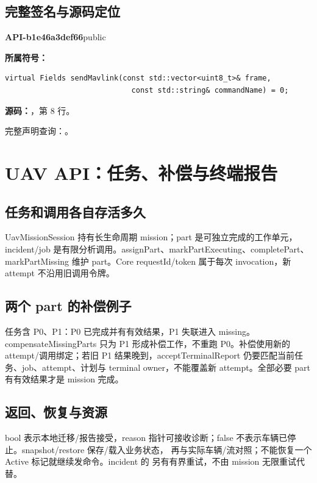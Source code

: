 \subsection{完整签名与源码定位}

\textbf{API-b1e46a3def66}\quad public\par
\textbf{所属符号：}\par
\begin{Verbatim}[fontsize=\footnotesize,breaklines,breakanywhere]
virtual Fields sendMavlink(const std::vector<uint8_t>& frame,
                             const std::string& commandName) = 0;
\end{Verbatim}
\textbf{源码：}，第 8 行。\par

完整声明查询：。

\section{UAV API：任务、补偿与终端报告}

\subsection{任务和调用各自存活多久}
UavMissionSession 持有长生命周期 mission；part 是可独立完成的工作单元，incident/job 是有限分析调用。assignPart、markPartExecuting、completePart、markPartMissing 维护 part。Core requestId/token 属于每次 invocation，新 attempt 不沿用旧调用令牌。

\subsection{两个 part 的补偿例子}
任务含 P0、P1：P0 已完成并有有效结果，P1 失联进入 missing。compensateMissingParts 只为 P1 形成补偿工作，不重跑 P0。补偿使用新的 attempt/调用绑定；若旧 P1 结果晚到，acceptTerminalReport 仍要匹配当前任务、job、attempt、计划与 terminal owner，不能覆盖新 attempt。全部必要 part 有有效结果才是 mission 完成。

\subsection{返回、恢复与资源}
bool 表示本地迁移/报告接受，reason 指针可接收诊断；false 不表示车辆已停止。snapshot/restore 保存/载入业务状态， 再与实际车辆/流对照；不能恢复一个 Active 标记就继续发命令。incident 的  另有有界重试，不由 mission 无限重试代替。

